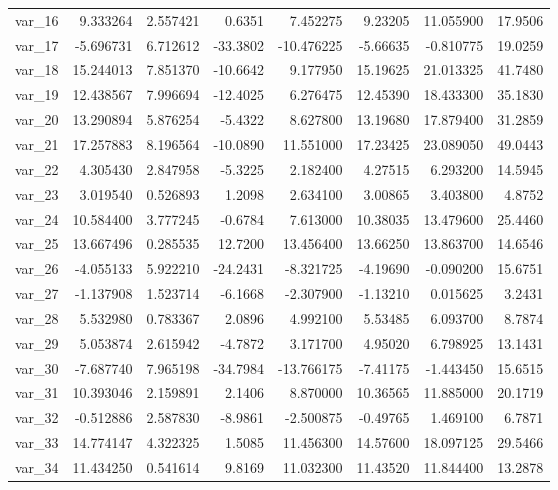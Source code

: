 \documentclass[12pt]{article}
\begin{document}
\begin{longtable}{lrrrrrrr}
  var\_16 &   9.333264 &   2.557421 &   0.6351 &   7.452275 &   9.23205 &  11.055900 &  17.9506 \\
  var\_17 &  -5.696731 &   6.712612 & -33.3802 & -10.476225 &  -5.66635 &  -0.810775 &  19.0259 \\
  var\_18 &  15.244013 &   7.851370 & -10.6642 &   9.177950 &  15.19625 &  21.013325 &  41.7480 \\
  var\_19 &  12.438567 &   7.996694 & -12.4025 &   6.276475 &  12.45390 &  18.433300 &  35.1830 \\
  var\_20 &  13.290894 &   5.876254 &  -5.4322 &   8.627800 &  13.19680 &  17.879400 &  31.2859 \\
  var\_21 &  17.257883 &   8.196564 & -10.0890 &  11.551000 &  17.23425 &  23.089050 &  49.0443 \\
  var\_22 &   4.305430 &   2.847958 &  -5.3225 &   2.182400 &   4.27515 &   6.293200 &  14.5945 \\
  var\_23 &   3.019540 &   0.526893 &   1.2098 &   2.634100 &   3.00865 &   3.403800 &   4.8752 \\
  var\_24 &  10.584400 &   3.777245 &  -0.6784 &   7.613000 &  10.38035 &  13.479600 &  25.4460 \\
  var\_25 &  13.667496 &   0.285535 &  12.7200 &  13.456400 &  13.66250 &  13.863700 &  14.6546 \\
  var\_26 &  -4.055133 &   5.922210 & -24.2431 &  -8.321725 &  -4.19690 &  -0.090200 &  15.6751 \\
  var\_27 &  -1.137908 &   1.523714 &  -6.1668 &  -2.307900 &  -1.13210 &   0.015625 &   3.2431 \\
  var\_28 &   5.532980 &   0.783367 &   2.0896 &   4.992100 &   5.53485 &   6.093700 &   8.7874 \\
  var\_29 &   5.053874 &   2.615942 &  -4.7872 &   3.171700 &   4.95020 &   6.798925 &  13.1431 \\
  var\_30 &  -7.687740 &   7.965198 & -34.7984 & -13.766175 &  -7.41175 &  -1.443450 &  15.6515 \\
  var\_31 &  10.393046 &   2.159891 &   2.1406 &   8.870000 &  10.36565 &  11.885000 &  20.1719 \\
  var\_32 &  -0.512886 &   2.587830 &  -8.9861 &  -2.500875 &  -0.49765 &   1.469100 &   6.7871 \\
  var\_33 &  14.774147 &   4.322325 &   1.5085 &  11.456300 &  14.57600 &  18.097125 &  29.5466 \\
  var\_34 &  11.434250 &   0.541614 &   9.8169 &  11.032300 &  11.43520 &  11.844400 &  13.2878 \\

\end{longtable}
\end{document}
